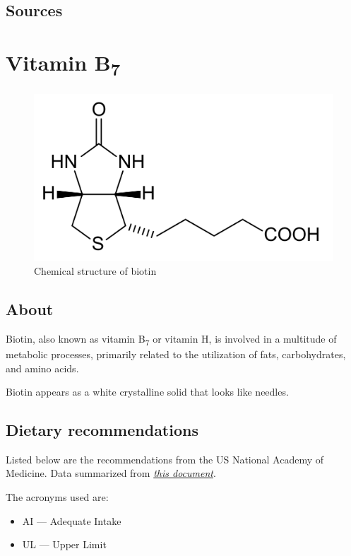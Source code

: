 \documentclass{book}
\begin{document}
\begin{sloppypar}
\section{Sources}


\chapter{Vitamin B\texorpdfstring{\textsubscript{7}}{7}}
\begin{figure}[h]
	\caption{Chemical structure of biotin}
	\centering \includegraphics[width=\textwidth]{images/Vitamin_B7_chemical_structure}
\end{figure}
\newpage

\section{About}
Biotin, also known as vitamin B\textsubscript{7} or vitamin H, is involved in a multitude of metabolic processes, primarily related to the utilization of fats, carbohydrates, and amino acids.

Biotin appears as a white crystalline solid that looks like needles.

\section{Dietary recommendations}
Listed below are the recommendations from the US National Academy of Medicine. Data summarized from \href{https://nap.nationalacademies.org/read/6015/chapter/13}{\textit{this document}}.

The acronyms used are:
\begin{itemize}
	\item AI --- Adequate Intake
	\item UL --- Upper Limit
\end{itemize}


\end{sloppypar}
\end{document}
